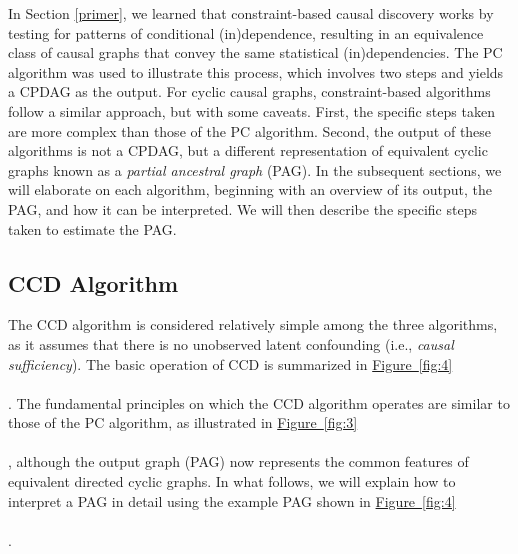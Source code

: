 \documentclass[twoside, 11pt]{article}
\newcommand*{\figref}[2][]{%
  \hyperref[{fig:#2}]{%
    Figure~\ref*{fig:#2}%
    \ifx\\#1\\%
    \else
      #1%
    \fi
  }%
}
\begin{document}
In Section \ref{primer}, we learned that constraint-based causal discovery works by testing for patterns of conditional (in)dependence, resulting in an equivalence class of causal graphs that convey the same statistical (in)dependencies. The PC algorithm was used to illustrate this process, which involves two steps and yields a CPDAG as the output. For cyclic causal graphs, constraint-based algorithms follow a similar approach, but with some caveats. First, the specific steps taken are more complex than those of the PC algorithm. Second, the output of these algorithms is not a CPDAG, but a different representation of equivalent cyclic graphs known as a \textit{partial ancestral graph} (PAG). In the subsequent sections, we will elaborate on each algorithm, beginning with an overview of its output, the PAG, and how it can be interpreted. We will then describe the specific steps taken to estimate the PAG.




\subsection{CCD Algorithm}
The CCD algorithm is considered relatively simple among the three algorithms, as it assumes that there is no unobserved latent confounding (i.e., \textit{causal sufficiency}). The basic operation of CCD is summarized in \figref[]{4}. The fundamental principles on which the CCD algorithm operates are similar to those of the PC algorithm, as illustrated in \figref[]{3}, although the output graph (PAG) now represents the common features of equivalent directed cyclic graphs.
In what follows, we will explain how to interpret a PAG in detail using the example PAG shown in \figref[]{4}.
\end{document}
